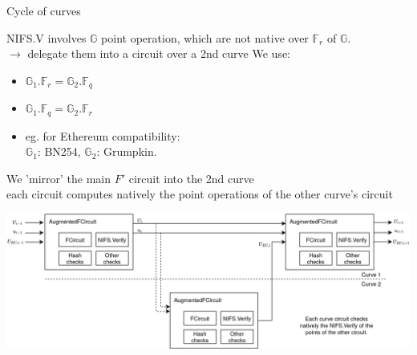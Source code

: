 \documentclass[t]{beamer} \usefonttheme[onlymath]{serif}
\begin{document}
\begin{frame}{Cycle of curves}
  \scriptsize{
    NIFS.V involves $\mathbb{G}$ point operation, which are not native over $\mathbb{F}_r$ of $\mathbb{G}$.
  \\$\longrightarrow$ delegate them into a circuit over a 2nd curve 
  We use:
  \begin{itemize}
    \item $\mathbb{G}_1.\mathbb{F}_r = \mathbb{G}_2.\mathbb{F}_q$
    \item $\mathbb{G}_1.\mathbb{F}_q = \mathbb{G}_2.\mathbb{F}_r$
    \item eg. for Ethereum compatibility:\\
      $\mathbb{G}_1$: BN254, $\mathbb{G}_2$: Grumpkin.
  \end{itemize}

  We 'mirror' the main $F'$ circuit into the 2nd curve\\
  each circuit computes natively the point operations of the other curve's circuit
  }
  \vspace{0.3cm}

  \includegraphics[width=\textwidth]{nova-cycle-of-curves-mirror}
\end{frame}
\end{document}
